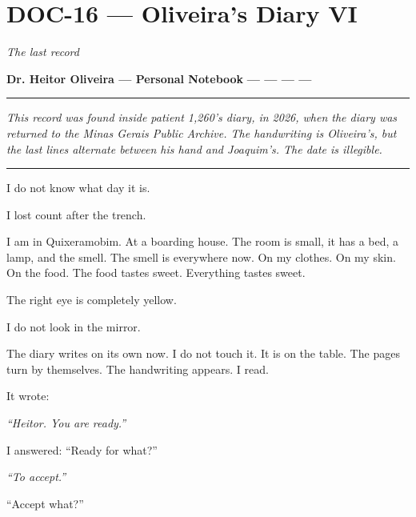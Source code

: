\section*{\textbf{DOC-16} --- Oliveira's Diary VI}

\noindent \textit{The last record}

\noindent \textbf{Dr. Heitor Oliveira --- Personal Notebook}
\textbf{--- --- --- ---}

\vspace{0.5em}\noindent\rule{\textwidth}{0.5pt}\vspace{0.5em}

\noindent \textit{This record was found inside patient 1,260's diary, in 2026, when the diary was returned to the Minas Gerais Public Archive. The handwriting is Oliveira's, but the last lines alternate between his hand and Joaquim's. The date is illegible.}

\vspace{0.5em}\noindent\rule{\textwidth}{0.5pt}\vspace{0.5em}

\noindent I do not know what day it is.

\noindent I lost count after the trench.

\noindent I am in Quixeramobim. At a boarding house. The room is small, it has a bed, a lamp, and the smell. The smell is everywhere now. On my clothes. On my skin. On the food. The food tastes sweet. Everything tastes sweet.

\noindent The right eye is completely yellow.

\noindent I do not look in the mirror.

\noindent The diary writes on its own now. I do not touch it. It is on the table. The pages turn by themselves. The handwriting appears. I read.

\noindent It wrote:

\noindent \textit{\textquotedblleft{}Heitor. You are ready.\textquotedblright{}}

\noindent I answered: \textquotedblleft{}Ready for what?\textquotedblright{}

\noindent \textit{\textquotedblleft{}To accept.\textquotedblright{}}

\noindent \textquotedblleft{}Accept what?\textquotedblright{}

